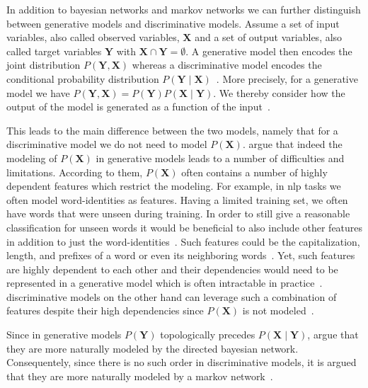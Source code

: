 In addition to \glspl{bayesian network} and \glspl{markov network} we can further distinguish between \glspl{generative model} and \glspl{discriminative model}.
Assume a set of input variables, also called \glspl{observed variable}, $\mathbf{X}$ and a set of output variables, also called \glspl{target variable} $\mathbf{Y}$ with $\mathbf{X}\cap\mathbf{Y}=\emptyset$.
A \gls{generative model} then encodes the \gls{joint distribution} $P(\mathbf{Y},\mathbf{X})$ whereas a \gls{discriminative model} encodes the \gls{conditional probability distribution} $P(\mathbf{Y}\mid\mathbf{X})$~\citep{koller2009probabilistic}.
More precisely, for a \gls{generative model} we have $P(\mathbf{Y},\mathbf{X})=P(\mathbf{Y})P(\mathbf{X}\mid\mathbf{Y})$.
We thereby consider how the output of the model is generated as a function of the input~\citep{sutton2010introduction}.

This leads to the main difference between the two models, namely that for a \gls{discriminative model} we do not need to model $P(\mathbf{X})$.
\citet{sutton2010introduction} argue that indeed the modeling of $P(\mathbf{X})$ in \glspl{generative model} leads to a number of difficulties and limitations.
According to them, $P(\mathbf{X})$ often contains a number of highly dependent features which restrict the modeling.
For example, in \gls{nlp} tasks we often model word-identities as features.
Having a limited training set, we often have words that were unseen during training.
In order to still give a reasonable classification for unseen words it would be beneficial to also include other features in addition to just the word-identities~\citep{sutton2010introduction}.
Such features could be the capitalization, length, and prefixes of a word or even its neighboring words~\citep{sutton2010introduction}.
Yet, such features are highly dependent to each other and their dependencies would need to be represented in a \gls{generative model} which is often intractable in practice~\citep{sutton2010introduction}.
\Glspl{discriminative model} on the other hand can leverage such a combination of features despite their high dependencies since $P(\mathbf{X})$ is not modeled~\citep{koller2009probabilistic}.

Since in \glspl{generative model} $P(\mathbf{Y})$ topologically precedes $P(\mathbf{X}\mid\mathbf{Y})$, \citet{sutton2010introduction} argue that they are more naturally modeled by the directed \gls{bayesian network}.
Consequentely, since there is no such order in \glspl{discriminative model}, it is argued that they are more naturally modeled by a \gls{markov network}~\citep{sutton2010introduction}.

